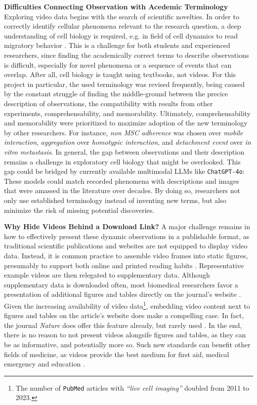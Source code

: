 \textbf{Difficulties Connecting Observation with Acedemic Terminology} Exploring video data
begins with the search of scientific novelties. In order to correctly identify
cellular phenomena relevant to the research question, a deep
understanding of cell biology is required, e.g. in field of cell dynamics to
read migratory behavior \cite{nalbantExploratoryCellDynamics2018}. This is a
challenge for both students and experienced researchers, since finding the
academically correct terms to describe observations is difficult, especially for
novel phenomena or a sequence of events that can overlap. After all, cell
biology is taught using textbooks, not videos. For this project in particular,
the used terminology was revised frequently, being caused by the constant
struggle of finding the middle-ground between the precice description of
observations, the compatibility with results from other experiments,
comprehensability, and memorability. Ultimately, comprehensability and
memorability were prioritized to maximize adoption of the new terminology by
other researchers. For instance, \emph{non MSC adherence} was chosen over
\emph{mobile interaction}, \emph{aggregation} over \emph{homotypic interaction},
and \emph{detachment event} over \emph{in vitro metastasis}. In general, the gap
between observations and their description remains a challenge in exploratory
cell biology that might be overlooked. This gap could be bridged by currently
available multimodal \acp{LLM} like \texttt{ChatGPT-4o}: These models could
match recorded phenomena with descriptions and images that were amassed in the
literature over decades. By doing so, researchers not only use established
terminology instead of inventing new terms, but also minimize the risk of
missing potential discoveries.

\textbf{Why Hide Videos Behind a Download Link?} A major challenge remains in how
to effectively present these dynamic observations in a publishable format, as
traditional scientific publications and websites are not equipped to display
video data. Instead, it is common practice to assemble video frames into static
figures, presumably to support both online and printed reading habits
\cite{perasDigitalPaperReading2023}. Representative example videos are then
relegated to supplementary data. Although supplementary data is downloaded
often, most biomedical researchers favor a presentation of additional figures
and tables directly on the journal's website
\cite{priceRoleSupplementaryMaterial2018}. Given the increasing availability of
video data\footnote{\label{foot:articles_livecellimaging}The number of \texttt{PubMed} articles with \emph{``live cell
        imaging''} doubled from 2011 to 2023.}, embedding video content next to figures
and tables on the article's website does make a compelling case. In fact, the
journal \emph{Nature} does offer this feature already, but rarely used
\cite{NatureVideoContent}. In the end, there is no reason to not present videos
alongsife figures and tables, as they can be as informative, and potentially
more so. Such new standards can benefit other fields of medicine, as videos
provide the best medium for first aid, medical emergency and education
\cite{guptaDatasetMedicalInstructional2023}.

